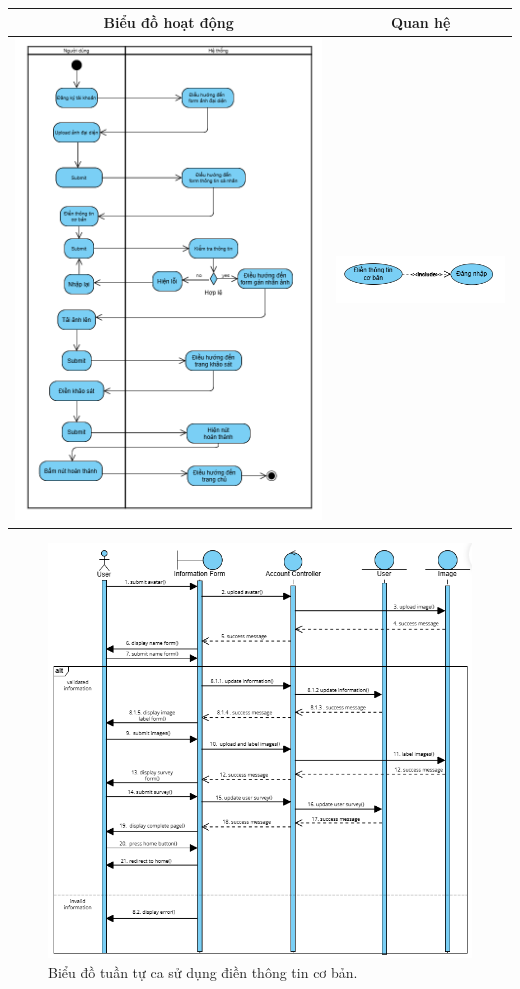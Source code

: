 \noindent 
\begin{tabular}{| c | c |}
    \hline
    \textbf{Biểu đồ hoạt động} & \textbf{Quan hệ} \\ 
    \hline
    \includegraphics[width=0.6\linewidth]{figures/c3/3-3-3-activity-diagram.png} 
    & 
    \includegraphics[width=0.35\linewidth]{figures/c3/3-3-3-relationship.png} \\ 
    \hline
\end{tabular}

\begin{figure}[H]
    \centering  
    \includegraphics[width=1.1\textwidth]{figures/c3/3-3-3-sequence-diagram.png}
    \caption{Biểu đồ tuần tự ca sử dụng điền thông tin cơ bản.}
    \label{fig:3-3-3-sequence-diagram}
\end{figure}